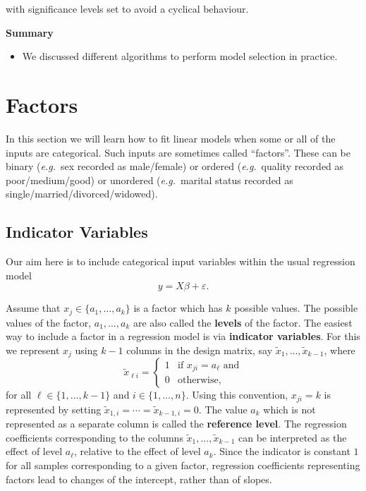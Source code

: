 \documentclass[
  a4paper,
]{article}
\providecommand{\tightlist}{%
  \setlength{\itemsep}{0pt}\setlength{\parskip}{0pt}}
\theoremstyle{definition}
\theoremstyle{definition}
\theoremstyle{definition}
\theoremstyle{definition}
\theoremstyle{remark}
\begin{document}
with significance levels set to avoid a cyclical behaviour.

\textbf{Summary}

\begin{itemize}
\tightlist
\item
  We discussed different algorithms to perform model selection in practice.
\end{itemize}

\clearpage

\hypertarget{S15-factors}{%
\section{Factors}\label{S15-factors}}

In this section we will learn how to fit linear models when some or all
of the inputs are categorical. Such inputs are sometimes called ``factors''.
These can be
binary (\emph{e.g.}~sex recorded as male/female)
or ordered (\emph{e.g.}~quality recorded as poor/medium/good)
or unordered (\emph{e.g.}~marital status recorded as single/married/divorced/widowed).

\hypertarget{indicator-variables}{%
\subsection{Indicator Variables}\label{indicator-variables}}

Our aim here is to include categorical input variables within the
usual regression model
\begin{equation*}
  y
  = X\beta + \varepsilon.
\end{equation*}

Assume that \(x_j \in \{a_1, \ldots, a_k\}\) is a factor which has \(k\) possible
values. The possible values of the factor, \(a_1, \ldots, a_k\) are also called
the \textbf{levels} of the factor. The easiest way to include a factor in a
regression model is via \textbf{indicator variables}. For this we represent \(x_j\)
using \(k-1\) columns in the design matrix, say \(\tilde x_1, \ldots, \tilde x_{k-1}\), where
\begin{equation*}
  \tilde x_{\ell i}
  = \begin{cases}
    1 & \mbox{if $x_{ji} = a_\ell$ and} \\
    0 & \mbox{otherwise,}
  \end{cases}
\end{equation*}
for all \(\ell \in \{1, \ldots, k-1\}\) and \(i \in \{1, \ldots, n\}\).
Using this convention, \(x_{ji} = k\) is represented by setting
\(\tilde x_{1,i} = \cdots = \tilde x_{k-1,i} = 0\). The value \(a_k\)
which is not represented as a separate column is called the
\textbf{reference level}. The regression coefficients corresponding to the
columns \(\tilde x_1, \ldots, \tilde x_{k-1}\) can be interpreted
as the effect of level \(a_\ell\), relative to the effect
of level \(a_k\). Since the indicator is constant \(1\) for all samples
corresponding to a given factor, regression coefficients representing factors
lead to changes of the intercept, rather than of slopes.
\end{document}

